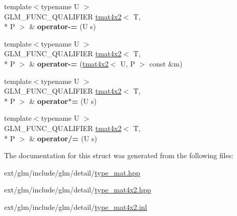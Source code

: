 \begin{DoxyCompactItemize}
\item 
\hypertarget{structglm_1_1tmat4x2_ae2ad696a80928bd3ba571e8e65b196fb}{{\footnotesize template$<$typename U $>$ }\\G\-L\-M\-\_\-\-F\-U\-N\-C\-\_\-\-Q\-U\-A\-L\-I\-F\-I\-E\-R \hyperlink{structglm_1_1tmat4x2}{tmat4x2}$<$ T, \\*
P $>$ \& {\bfseries operator-\/=} (U s)}\label{structglm_1_1tmat4x2_ae2ad696a80928bd3ba571e8e65b196fb}

\item 
\hypertarget{structglm_1_1tmat4x2_a543c1cb13551ba460439f6546e813c4c}{{\footnotesize template$<$typename U $>$ }\\G\-L\-M\-\_\-\-F\-U\-N\-C\-\_\-\-Q\-U\-A\-L\-I\-F\-I\-E\-R \hyperlink{structglm_1_1tmat4x2}{tmat4x2}$<$ T, \\*
P $>$ \& {\bfseries operator-\/=} (\hyperlink{structglm_1_1tmat4x2}{tmat4x2}$<$ U, P $>$ const \&m)}\label{structglm_1_1tmat4x2_a543c1cb13551ba460439f6546e813c4c}

\item 
\hypertarget{structglm_1_1tmat4x2_abff57703eba125c97a625c94924d8e52}{{\footnotesize template$<$typename U $>$ }\\G\-L\-M\-\_\-\-F\-U\-N\-C\-\_\-\-Q\-U\-A\-L\-I\-F\-I\-E\-R \hyperlink{structglm_1_1tmat4x2}{tmat4x2}$<$ T, \\*
P $>$ \& {\bfseries operator$\ast$=} (U s)}\label{structglm_1_1tmat4x2_abff57703eba125c97a625c94924d8e52}

\item 
\hypertarget{structglm_1_1tmat4x2_a7ad8f4359e6257d46c597bc345d90205}{{\footnotesize template$<$typename U $>$ }\\G\-L\-M\-\_\-\-F\-U\-N\-C\-\_\-\-Q\-U\-A\-L\-I\-F\-I\-E\-R \hyperlink{structglm_1_1tmat4x2}{tmat4x2}$<$ T, \\*
P $>$ \& {\bfseries operator/=} (U s)}\label{structglm_1_1tmat4x2_a7ad8f4359e6257d46c597bc345d90205}

\end{DoxyCompactItemize}


The documentation for this struct was generated from the following files\-:\begin{DoxyCompactItemize}
\item 
ext/glm/include/glm/detail/\hyperlink{type__mat_8hpp}{type\-\_\-mat.\-hpp}\item 
ext/glm/include/glm/detail/\hyperlink{type__mat4x2_8hpp}{type\-\_\-mat4x2.\-hpp}\item 
ext/glm/include/glm/detail/\hyperlink{type__mat4x2_8inl}{type\-\_\-mat4x2.\-inl}\end{DoxyCompactItemize}
